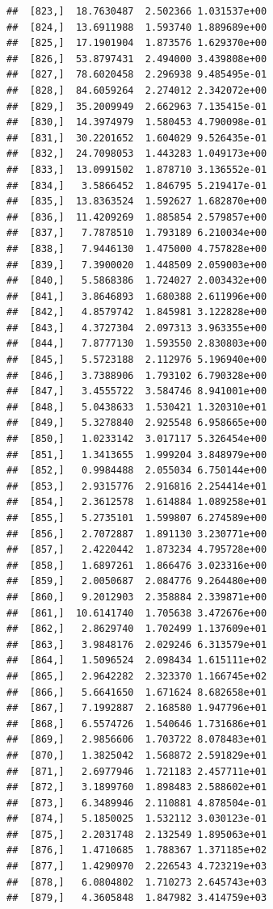 \documentclass[article]{jss}\usepackage[]{graphicx}\usepackage[]{xcolor}
\makeatletter
\newenvironment{kframe}{%
 \def\at@end@of@kframe{}%
 \ifinner\ifhmode%
  \def\at@end@of@kframe{\end{minipage}}%
  \begin{minipage}{\columnwidth}%
 \fi\fi%
 \def\FrameCommand##1{\hskip\@totalleftmargin \hskip-\fboxsep
 \colorbox{shadecolor}{##1}\hskip-\fboxsep
     \hskip-\linewidth \hskip-\@totalleftmargin \hskip\columnwidth}%
 \MakeFramed {\advance\hsize-\width
   \@totalleftmargin\z@ \linewidth\hsize
   \@setminipage}}%
 {\par\unskip\endMakeFramed%
 \at@end@of@kframe}
\newenvironment{knitrout}{}{} %
\makeatother
\begin{document}
\begin{knitrout}
\begin{kframe}
\begin{verbatim}
##  [823,]  18.7630487  2.502366 1.031537e+00
##  [824,]  13.6911988  1.593740 1.889689e+00
##  [825,]  17.1901904  1.873576 1.629370e+00
##  [826,]  53.8797431  2.494000 3.439808e+00
##  [827,]  78.6020458  2.296938 9.485495e-01
##  [828,]  84.6059264  2.274012 2.342072e+00
##  [829,]  35.2009949  2.662963 7.135415e-01
##  [830,]  14.3974979  1.580453 4.790098e-01
##  [831,]  30.2201652  1.604029 9.526435e-01
##  [832,]  24.7098053  1.443283 1.049173e+00
##  [833,]  13.0991502  1.878710 3.136552e-01
##  [834,]   3.5866452  1.846795 5.219417e-01
##  [835,]  13.8363524  1.592627 1.682870e+00
##  [836,]  11.4209269  1.885854 2.579857e+00
##  [837,]   7.7878510  1.793189 6.210034e+00
##  [838,]   7.9446130  1.475000 4.757828e+00
##  [839,]   7.3900020  1.448509 2.059003e+00
##  [840,]   5.5868386  1.724027 2.003432e+00
##  [841,]   3.8646893  1.680388 2.611996e+00
##  [842,]   4.8579742  1.845981 3.122828e+00
##  [843,]   4.3727304  2.097313 3.963355e+00
##  [844,]   7.8777130  1.593550 2.830803e+00
##  [845,]   5.5723188  2.112976 5.196940e+00
##  [846,]   3.7388906  1.793102 6.790328e+00
##  [847,]   3.4555722  3.584746 8.941001e+00
##  [848,]   5.0438633  1.530421 1.320310e+01
##  [849,]   5.3278840  2.925548 6.958665e+00
##  [850,]   1.0233142  3.017117 5.326454e+00
##  [851,]   1.3413655  1.999204 3.848979e+00
##  [852,]   0.9984488  2.055034 6.750144e+00
##  [853,]   2.9315776  2.916816 2.254414e+01
##  [854,]   2.3612578  1.614884 1.089258e+01
##  [855,]   5.2735101  1.599807 6.274589e+00
##  [856,]   2.7072887  1.891130 3.230771e+00
##  [857,]   2.4220442  1.873234 4.795728e+00
##  [858,]   1.6897261  1.866476 3.023316e+00
##  [859,]   2.0050687  2.084776 9.264480e+00
##  [860,]   9.2012903  2.358884 2.339871e+00
##  [861,]  10.6141740  1.705638 3.472676e+00
##  [862,]   2.8629740  1.702499 1.137609e+01
##  [863,]   3.9848176  2.029246 6.313579e+01
##  [864,]   1.5096524  2.098434 1.615111e+02
##  [865,]   2.9642282  2.323370 1.166745e+02
##  [866,]   5.6641650  1.671624 8.682658e+01
##  [867,]   7.1992887  2.168580 1.947796e+01
##  [868,]   6.5574726  1.540646 1.731686e+01
##  [869,]   2.9856606  1.703722 8.078483e+01
##  [870,]   1.3825042  1.568872 2.591829e+01
##  [871,]   2.6977946  1.721183 2.457711e+01
##  [872,]   3.1899760  1.898483 2.588602e+01
##  [873,]   6.3489946  2.110881 4.878504e-01
##  [874,]   5.1850025  1.532112 3.030123e-01
##  [875,]   2.2031748  2.132549 1.895063e+01
##  [876,]   1.4710685  1.788367 1.371185e+02
##  [877,]   1.4290970  2.226543 4.723219e+03
##  [878,]   6.0804802  1.710273 2.645743e+03
##  [879,]   4.3605848  1.847982 3.414759e+03

\end{verbatim}
\end{kframe}
\end{knitrout}
\end{document}
